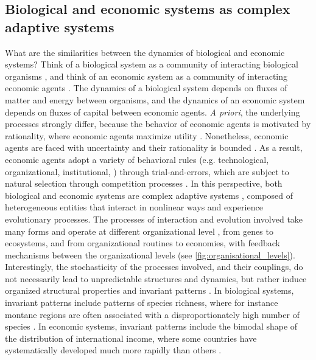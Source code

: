 \subsection{Biological and economic systems as complex adaptive systems}
What are the similarities between the dynamics of biological and economic systems? 
% 
Think of a biological system as a community of interacting biological organisms \citep{chapin2002principles}, and think of an economic system as a community of interacting economic agents \citep{Dopfer2007}.
% 
The dynamics of a biological system depends on fluxes of matter and energy between organisms, and the dynamics of an economic system depends on fluxes of capital between economic agents.
% 
\textit{A priori}, the underlying processes strongly differ, because the behavior of economic agents is motivated by rationality, where economic agents maximize utility \citep{10.1093/cje/bet027}. 
% 
Nonetheless, economic agents are faced with uncertainty \citep{Foster2012} and their rationality is bounded \citep{Veblen1898,nelson1985evolutionary}. As a result, economic agents adopt a variety of behavioral rules (e.g. technological, organizational, institutional, \cite{Foster2012}) through trial-and-errors, which are subject to natural selection through competition processes \citep{schumpeter2017theory}.
% 
In this perspective, both biological and economic systems are complex adaptive systems \citep{Levin2002}, composed of heterogeneous entities that interact in nonlinear ways and experience evolutionary processes. 
% 
% 
The processes of interaction and evolution involved take many forms and operate at different organizational level \citep{Levin1998}, from genes to ecosystems, and from organizational routines to economies, with feedback mechanisms between the organizational levels (see \cref{fig:organisational_levels}).
% 
Interestingly, the stochasticity of the processes involved, and their couplings, do not necessarily lead to unpredictable structures and dynamics, but rather induce organized structural properties and invariant patterns \citep{Olff2009,mitchell2009complexity}. 
% 
In biological systems, invariant patterns include patterns of species richness, where for instance montane regions are often associated with a disproportionately high number of species \citep{Rahbek2019}. In economic systems, invariant patterns include the bimodal shape of the distribution of international income, where some countries have systematically developed much more rapidly than others \citep{acemoglu2001colonial}. 
